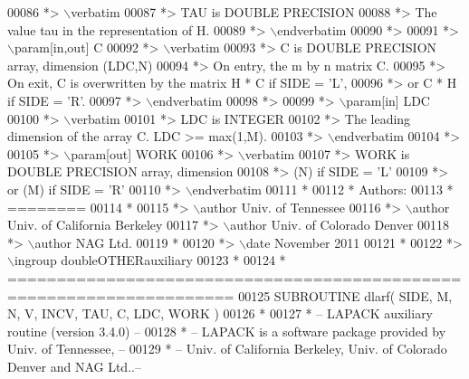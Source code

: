 \begin{DoxyCode}
00086 \textcolor{comment}{*> \(\backslash\)verbatim}
00087 \textcolor{comment}{*>          TAU is DOUBLE PRECISION}
00088 \textcolor{comment}{*>          The value tau in the representation of H.}
00089 \textcolor{comment}{*> \(\backslash\)endverbatim}
00090 \textcolor{comment}{*>}
00091 \textcolor{comment}{*> \(\backslash\)param[in,out] C}
00092 \textcolor{comment}{*> \(\backslash\)verbatim}
00093 \textcolor{comment}{*>          C is DOUBLE PRECISION array, dimension (LDC,N)}
00094 \textcolor{comment}{*>          On entry, the m by n matrix C.}
00095 \textcolor{comment}{*>          On exit, C is overwritten by the matrix H * C if SIDE = 'L',}
00096 \textcolor{comment}{*>          or C * H if SIDE = 'R'.}
00097 \textcolor{comment}{*> \(\backslash\)endverbatim}
00098 \textcolor{comment}{*>}
00099 \textcolor{comment}{*> \(\backslash\)param[in] LDC}
00100 \textcolor{comment}{*> \(\backslash\)verbatim}
00101 \textcolor{comment}{*>          LDC is INTEGER}
00102 \textcolor{comment}{*>          The leading dimension of the array C. LDC >= max(1,M).}
00103 \textcolor{comment}{*> \(\backslash\)endverbatim}
00104 \textcolor{comment}{*>}
00105 \textcolor{comment}{*> \(\backslash\)param[out] WORK}
00106 \textcolor{comment}{*> \(\backslash\)verbatim}
00107 \textcolor{comment}{*>          WORK is DOUBLE PRECISION array, dimension}
00108 \textcolor{comment}{*>                         (N) if SIDE = 'L'}
00109 \textcolor{comment}{*>                      or (M) if SIDE = 'R'}
00110 \textcolor{comment}{*> \(\backslash\)endverbatim}
00111 \textcolor{comment}{*}
00112 \textcolor{comment}{*  Authors:}
00113 \textcolor{comment}{*  ========}
00114 \textcolor{comment}{*}
00115 \textcolor{comment}{*> \(\backslash\)author Univ. of Tennessee }
00116 \textcolor{comment}{*> \(\backslash\)author Univ. of California Berkeley }
00117 \textcolor{comment}{*> \(\backslash\)author Univ. of Colorado Denver }
00118 \textcolor{comment}{*> \(\backslash\)author NAG Ltd. }
00119 \textcolor{comment}{*}
00120 \textcolor{comment}{*> \(\backslash\)date November 2011}
00121 \textcolor{comment}{*}
00122 \textcolor{comment}{*> \(\backslash\)ingroup doubleOTHERauxiliary}
00123 \textcolor{comment}{*}
00124 \textcolor{comment}{*  =====================================================================}
00125 \textcolor{keyword}{      SUBROUTINE }dlarf( SIDE, M, N, V, INCV, TAU, C, LDC, WORK )
00126 \textcolor{comment}{*}
00127 \textcolor{comment}{*  -- LAPACK auxiliary routine (version 3.4.0) --}
00128 \textcolor{comment}{*  -- LAPACK is a software package provided by Univ. of Tennessee,    --}
00129 \textcolor{comment}{*  -- Univ. of California Berkeley, Univ. of Colorado Denver and NAG Ltd..--}

\end{DoxyCode}
